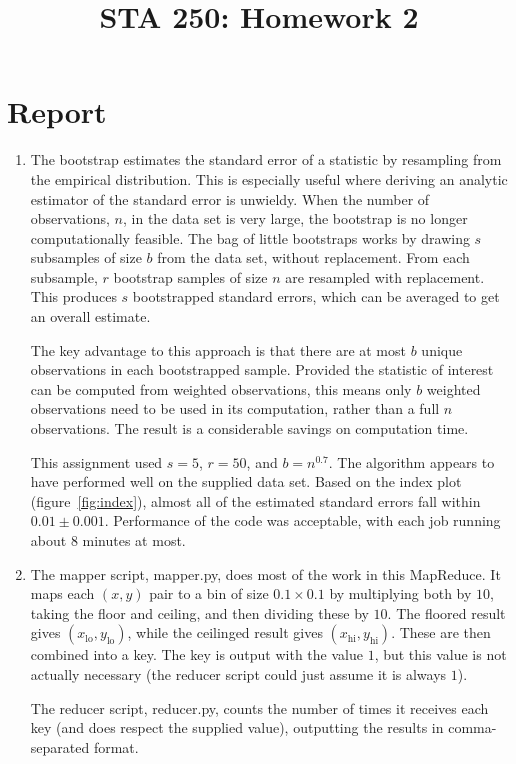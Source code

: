 

\pagestyle{name}
\title{STA 250: Homework 2}


\chapter*{Report}
\begin{enumerate}
\item
The bootstrap estimates the standard error of a statistic by resampling from
the empirical distribution.
This is especially useful where deriving an analytic estimator of the standard
error is unwieldy.
When the number of observations, $n$, in the data set is very large, the
bootstrap is no longer computationally feasible.
The bag of little bootstraps works by drawing $s$ subsamples of size $b$ from
the data set, without replacement. 
From each subsample, $r$ bootstrap samples of size $n$ are resampled with
replacement.
This produces $s$ bootstrapped standard errors, which can be averaged to get
an overall estimate.

The key advantage to this approach is that there are at most $b$ unique
observations in each bootstrapped sample.
Provided the statistic of interest can be computed from weighted observations,
this means only $b$ weighted observations need to be used in its computation,
rather than a full $n$ observations.
The result is a considerable savings on computation time.

This assignment used $s = 5$, $r = 50$, and $b = n^{0.7}$.
The algorithm appears to have performed well on the supplied data set.
Based on the index plot (figure~\ref{fig:index}), almost all of the estimated
standard errors fall within $0.01 \pm 0.001$.
Performance of the code was acceptable, with each job running about $8$
minutes at most.

\item
The mapper script, mapper.py, does most of the work in this MapReduce.
It maps each $(x, y)$ pair to a bin of size $0.1 \times 0.1$ by multiplying
both by $10$, taking the floor and ceiling, and then dividing these by $10$.
The floored result gives $(x_{\mathrm{lo}}, y_{\mathrm{lo}})$, 
while the ceilinged result gives $(x_{\mathrm{hi}}, y_{\mathrm{hi}})$.
These are then combined into a key.
The key is output with the value $1$, but this value is not actually
necessary (the reducer script could just assume it is always $1$).

The reducer script, reducer.py, counts the number of times it receives each
key (and does respect the supplied value), outputting the results in
comma-separated format.


\end{enumerate}
